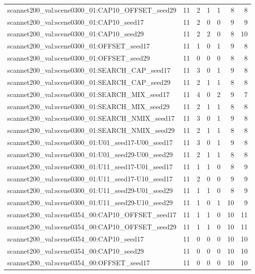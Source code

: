 \begin{table}[t]
\begin{tabular}{lrrrrrr}
scannet200\_val:scene0300\_01:CAP10\_OFFSET\_seed29 & 11 & 2 & 1 & 1 & 8 & 8 \\
scannet200\_val:scene0300\_01:CAP10\_seed17 & 11 & 2 & 0 & 0 & 9 & 9 \\
scannet200\_val:scene0300\_01:CAP10\_seed29 & 11 & 2 & 2 & 0 & 8 & 10 \\
scannet200\_val:scene0300\_01:OFFSET\_seed17 & 11 & 1 & 0 & 1 & 9 & 8 \\
scannet200\_val:scene0300\_01:OFFSET\_seed29 & 11 & 0 & 0 & 0 & 8 & 8 \\
scannet200\_val:scene0300\_01:SEARCH\_CAP\_seed17 & 11 & 3 & 0 & 1 & 9 & 8 \\
scannet200\_val:scene0300\_01:SEARCH\_CAP\_seed29 & 11 & 2 & 1 & 1 & 8 & 8 \\
scannet200\_val:scene0300\_01:SEARCH\_MIX\_seed17 & 11 & 4 & 0 & 2 & 9 & 7 \\
scannet200\_val:scene0300\_01:SEARCH\_MIX\_seed29 & 11 & 2 & 1 & 1 & 8 & 8 \\
scannet200\_val:scene0300\_01:SEARCH\_NMIX\_seed17 & 11 & 3 & 0 & 1 & 9 & 8 \\
scannet200\_val:scene0300\_01:SEARCH\_NMIX\_seed29 & 11 & 2 & 1 & 1 & 8 & 8 \\
scannet200\_val:scene0300\_01:U01\_seed17-U00\_seed17 & 11 & 3 & 0 & 1 & 9 & 8 \\
scannet200\_val:scene0300\_01:U01\_seed29-U00\_seed29 & 11 & 2 & 1 & 1 & 8 & 8 \\
scannet200\_val:scene0300\_01:U11\_seed17-U01\_seed17 & 11 & 1 & 1 & 0 & 8 & 9 \\
scannet200\_val:scene0300\_01:U11\_seed17-U10\_seed17 & 11 & 2 & 0 & 0 & 9 & 9 \\
scannet200\_val:scene0300\_01:U11\_seed29-U01\_seed29 & 11 & 1 & 1 & 0 & 8 & 9 \\
scannet200\_val:scene0300\_01:U11\_seed29-U10\_seed29 & 11 & 1 & 0 & 1 & 10 & 9 \\
scannet200\_val:scene0354\_00:CAP10\_OFFSET\_seed17 & 11 & 1 & 1 & 0 & 10 & 11 \\
scannet200\_val:scene0354\_00:CAP10\_OFFSET\_seed29 & 11 & 1 & 1 & 0 & 10 & 11 \\
scannet200\_val:scene0354\_00:CAP10\_seed17 & 11 & 0 & 0 & 0 & 10 & 10 \\
scannet200\_val:scene0354\_00:CAP10\_seed29 & 11 & 0 & 0 & 0 & 10 & 10 \\
scannet200\_val:scene0354\_00:OFFSET\_seed17 & 11 & 0 & 0 & 0 & 10 & 10 \\

\end{tabular}
\end{table}
